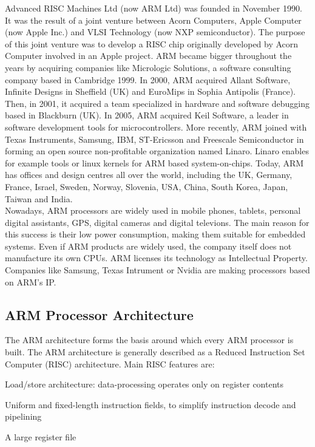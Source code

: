 \documentclass[pdftex,10pt,a4paper]{report}
\newenvironment{packed_item}{
\begin{itemize}
  \setlength{\itemsep}{1pt}
  \setlength{\parskip}{0pt}
  \setlength{\parsep}{0pt}
}{\end{itemize}}
\begin{document}
Advanced RISC Machines Ltd (now ARM Ltd) was founded in November 1990. It was the result of a joint venture between Acorn Computers, Apple Computer (now Apple Inc.) and VLSI Technology (now NXP semiconductor). The purpose of this joint venture was to develop a RISC chip originally developed by Acorn Computer involved in an Apple project. ARM became bigger throughout the years by acquiring companies like Micrologic Solutions, a software consulting company based in Cambridge 1999. In 2000, ARM acquired Allant Software, Infinite Designs in Sheffield (UK) and EuroMips in Sophia Antipolis (France). Then, in 2001, it acquired a team specialized in hardware and software debugging based in Blackburn (UK). In 2005, ARM acquired Keil Software, a leader in software development tools for microcontrollers. More recently, ARM joined with Texas Instruments, Samsung, IBM, ST-Ericsson and Freescale Semiconductor in forming an open source non-profitable organization named Linaro. Linaro enables for example tools or linux kernels for ARM based system-on-chips. Today, ARM has offices and design centres all over the world, including the UK, Germany, France, Israel, Sweden, Norway, Slovenia, USA, China, South Korea, Japan, Taiwan and India. 
\\

Nowadays, ARM processors are widely used in mobile phones, tablets, personal digital assistants, GPS, digital cameras and digital televions. The main reason for this success is their low power consumption, making them suitable for embedded systems. Even if ARM products are widely used, the company itself does not manufacture its own CPUs. ARM licenses its technology as Intellectual Property. Companies like Samsung, Texas Intrument or Nvidia are making processors based on ARM's IP.

\subsection{ARM Processor Architecture}
The ARM architecture forms the basis around which every ARM processor is built. The ARM architecture is generally described as a Reduced Instruction Set Computer (RISC) architecture. Main RISC features are:
\begin{packed_item}
	\item Load/store architecture: data-processing operates only on register contents
	\item Uniform and fixed-length instruction fields, to simplify instruction decode and pipelining
	\item A large register file
\end{packed_item}
\end{document}
